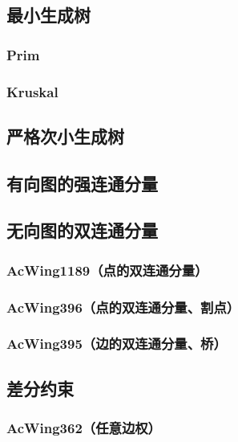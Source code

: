 \documentclass[12pt,a4paper]{article}
\begin{document}
\subsection{最小生成树}
\subsubsection{Prim}

\subsubsection{Kruskal}

\subsection{严格次小生成树}

\subsection{有向图的强连通分量}

\subsection{无向图的双连通分量}
\subsubsection{AcWing1189（点的双连通分量）}

\subsubsection{AcWing396（点的双连通分量、割点）}

\subsubsection{AcWing395（边的双连通分量、桥）}

\subsection{差分约束}
\subsubsection{AcWing362（任意边权）}
\begin{spacing}{1.5}

\end{spacing}

\end{document}
